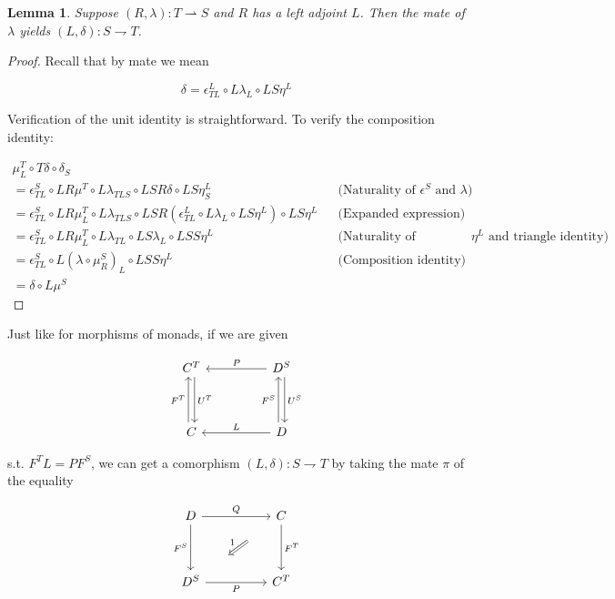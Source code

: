 \documentclass[10pt, oneside]{article}
\newtheorem{lemma}[theorem]{Lemma}
\begin{document}
\begin{lemma}
    Suppose $(R, \lambda): T \rightharpoonup S$ and $R$ has a left adjoint $L$. Then the mate of $\lambda$ yields $(L, \delta): S \rightharpoondown T$.
\end{lemma}
\begin{proof}
    Recall that by mate we mean

    $$\delta = \epsilon^L_{TL} \circ L \lambda_L \circ L S \eta^L$$
    
    Verification of the unit identity is straightforward. To verify the composition identity:

    \begin{align*}
        \mu^T_L \circ T \delta \circ \delta_S
        \\ = \epsilon^S_{TL} \circ LR \mu^T \circ L \lambda_{TLS} \circ LSR \delta \circ LS \eta^L_S && \text{(Naturality of $\epsilon^S$ and $\lambda$)}
        \\ = \epsilon^S_{TL} \circ LR \mu^T_L \circ L \lambda_{TLS} \circ LSR (\epsilon^L_{TL} \circ L \lambda_{L} \circ LS \eta^L) \circ LS \eta^L && \text{(Expanded expression)}
        \\ = \epsilon^S_{TL} \circ LR \mu^T_L \circ L \lambda_{TL} \circ LS \lambda_{L} \circ L S S \eta^L && \text{(Naturality of rightmost $\eta^L$ and triangle identity)}
        \\ = \epsilon^S_{TL} \circ L (\lambda \circ \mu^S_R)_L \circ L S S \eta^L  && \text{(Composition identity)}
        \\ = \delta \circ L \mu^S
    \end{align*}
\end{proof}

Just like for morphisms of monads, if we are given

\[\begin{tikzcd}[ampersand replacement=\&]
	{C^T} \&\& {D^S} \\
	\\
	C \&\& D
	\arrow["{U^T}", shift left, from=1-1, to=3-1]
	\arrow["{U^S}", shift left, from=1-3, to=3-3]
	\arrow["{F^T}", shift left, from=3-1, to=1-1]
	\arrow["{F^S}", shift left, from=3-3, to=1-3]
	\arrow["P"', from=1-3, to=1-1]
	\arrow["L"', from=3-3, to=3-1]
\end{tikzcd}\]

\noindent s.t. $F^T L = P F^S$, we can get a comorphism $(L, \delta): S \rightharpoondown T$ by taking the mate $\pi$ of the equality

\[\begin{tikzcd}[ampersand replacement=\&]
	D \&\& C \\
	\\
	{D^S} \&\& {C^T}
	\arrow["Q", from=1-1, to=1-3]
	\arrow["{F^T}", from=1-3, to=3-3]
	\arrow["P"', from=3-1, to=3-3]
	\arrow["{F^S}"', from=1-1, to=3-1]
	\arrow["1"', shorten <=22pt, shorten >=22pt, Rightarrow, from=1-3, to=3-1]
\end{tikzcd}\]
\end{document}

